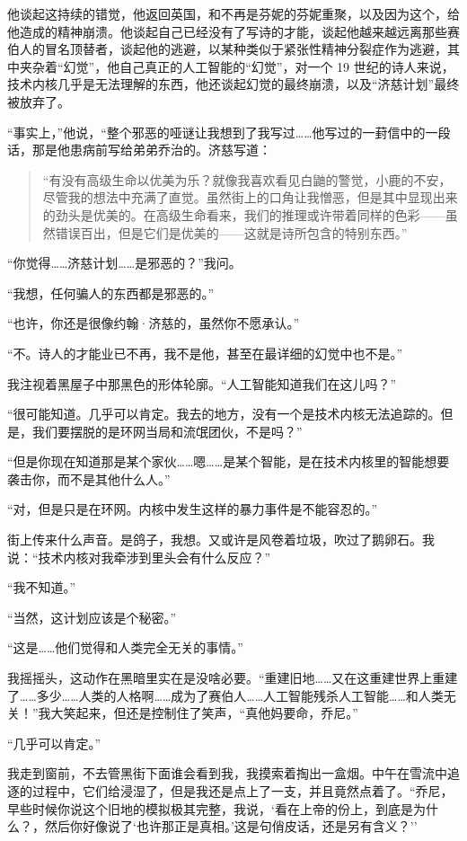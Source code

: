 \documentclass[AutoFakeBold=true]{book}
\begin{document}
他谈起这持续的错觉，他返回英国，和不再是芬妮的芬妮重聚，以及因为这个，给他造成的精神崩溃。他谈起自己已经没有了写诗的才能，谈起他越来越远离那些赛伯人的冒名顶替者，谈起他的逃避，以某种类似于紧张性精神分裂症作为逃避，其中夹杂着``幻觉''，他自己真正的人工智能的``幻觉''，对一个 19 世纪的诗人来说，技术内核几乎是无法理解的东西，他还谈起幻觉的最终崩溃，以及``济慈计划''最终被放弃了。

``事实上，''他说，``整个邪恶的哑谜让我想到了我写过……他写过的一葑信中的一段话，那是他患病前写给弟弟乔治的。济慈写道：

\begin{quotation}
	{\kaishu ``有没有高级生命以优美为乐？就像我喜欢看见白鼬的警觉，小鹿的不安，尽管我的想法中充满了直觉。虽然街上的口角让我憎恶，但是其中显现出来的劲头是优美的。在高级生命看来，我们的推理或许带着同样的色彩——虽然错误百出，但是它们是优美的——这就是诗所包含的特别东西。''}
\end{quotation}

``你觉得……济慈计划……是邪恶的？''我问。

``我想，任何骗人的东西都是邪恶的。''

``也许，你还是很像约翰·济慈的，虽然你不愿承认。''

``不。诗人的才能业已不再，我不是他，甚至在最详细的幻觉中也不是。''

我注视着黑屋子中那黑色的形体轮廓。``人工智能知道我们在这儿吗？''

``很可能知道。几乎可以肯定。我去的地方，没有一个是技术内核无法追踪的。但是，我们要摆脱的是环网当局和流氓团伙，不是吗？''

``但是你现在知道那是某个家伙……嗯……是某个智能，是在技术内核里的智能想要袭击你，而不是其他什么人。''

``对，但是只是在环网。内核中发生这样的暴力事件是不能容忍的。''

街上传来什么声音。是鸽子，我想。又或许是风卷着垃圾，吹过了鹅卵石。我说：``技术内核对我牵涉到里头会有什么反应？''

``我不知道。''

``当然，这计划应该是个秘密。''

``这是……他们觉得和人类完全无关的事情。''

我摇摇头，这动作在黑暗里实在是没啥必要。``重建旧地……又在这重建世界上重建了……多少……人类的人格啊……成为了赛伯人……人工智能残杀人工智能……和人类无关！''我大笑起来，但还是控制住了笑声，``真他妈要命，乔尼。''

``几乎可以肯定。''

我走到窗前，不去管黑街下面谁会看到我，我摸索着掏出一盒烟。中午在雪流中追逐的过程中，它们给浸湿了，但是我还是点上了一支，并且竟然点着了。``乔尼，早些时候你说这个旧地的模拟极其完整，我说，`看在上帝的份上，到底是为什么？，然后你好像说了`也许那正是真相。'这是句俏皮话，还是另有含义？''
\end{document}
